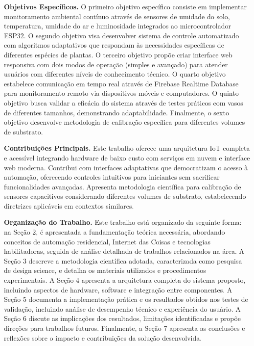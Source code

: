 \documentclass[oneside,english,brazilian]{UNISINOSmonografia}
\begin{document}
\medskip
\textbf{Objetivos Específicos.} O primeiro objetivo específico consiste em implementar monitoramento ambiental contínuo através de sensores de umidade do solo, temperatura, umidade do ar e luminosidade integrados ao microcontrolador ESP32. O segundo objetivo visa desenvolver sistema de controle automatizado com algoritmos adaptativos que respondam às necessidades específicas de diferentes espécies de plantas. O terceiro objetivo propõe criar interface web responsiva com dois modos de operação (simples e avançado) para atender usuários com diferentes níveis de conhecimento técnico. O quarto objetivo estabelece comunicação em tempo real através de Firebase Realtime Database para monitoramento remoto via dispositivos móveis e computadores. O quinto objetivo busca validar a eficácia do sistema através de testes práticos com vasos de diferentes tamanhos, demonstrando adaptabilidade. Finalmente, o sexto objetivo desenvolve metodologia de calibração específica para diferentes volumes de substrato.

\medskip

\textbf{Contribuições Principais.} Este trabalho oferece uma arquitetura IoT completa e acessível integrando hardware de baixo custo com serviços em nuvem e interface web moderna. Contribui com interfaces adaptativas que democratizam o acesso à automação, oferecendo controles intuitivos para iniciantes sem sacrificar funcionalidades avançadas. Apresenta metodologia científica para calibração de sensores capacitivos considerando diferentes volumes de substrato, estabelecendo diretrizes aplicáveis em contextos similares.
\medskip

\textbf{Organização do Trabalho.} Este trabalho está organizado da seguinte forma: na Seção 2, é apresentada a fundamentação teórica necessária, abordando conceitos de automação residencial, Internet das Coisas e tecnologias habilitadoras, seguida de análise detalhada de trabalhos relacionados na área. A Seção 3 descreve a metodologia científica adotada, caracterizada como pesquisa de design science, e detalha os materiais utilizados e procedimentos experimentais. A Seção 4 apresenta a arquitetura completa do sistema proposto, incluindo aspectos de hardware, software e integração entre componentes. A Seção 5 documenta a implementação prática e os resultados obtidos nos testes de validação, incluindo análise de desempenho técnico e experiência do usuário. A Seção 6 discute as implicações dos resultados, limitações identificadas e propõe direções para trabalhos futuros. Finalmente, a Seção 7 apresenta as conclusões e reflexões sobre o impacto e contribuições da solução desenvolvida.
\end{document}
